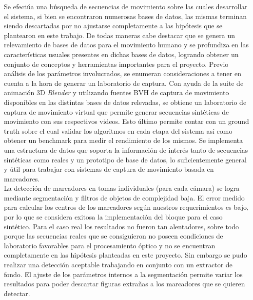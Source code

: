 Se efectúa una búsqueda de secuencias de movimiento sobre las cuales desarrollar el sistema, si bien se encontraron numerosas bases de datos, las mismas terminan siendo descartadas por no ajustarse completamente  a las hipótesis que se plantearon en este trabajo. De todas maneras cabe destacar que se genera un relevamiento de bases de datos para el movimiento humano y se profundiza en las características usuales presentes en dichas bases de datos, logrando obtener un conjunto de conceptos y herramientas importantes para el proyecto. Previo análisis de los parámetros involucrados, se enumeran consideraciones a tener en cuenta a la hora de generar un laboratorio de captura.
Con ayuda de la suite de animación 3D \emph{Blender} y utilizando fuentes BVH de captura de movimiento disponibles en las distintas bases de datos relevadas, se obtiene un laboratorio de captura de movimiento virtual que permite generar secuencias sintéticas de movimiento con sus respectivos videos. Esto último permite contar con un ground truth sobre el cual validar los algoritmos en cada etapa del sistema así como obtener un benchmark para medir el rendimiento de los mismos.
Se implementa una estructura de datos que soporta la información de interés tanto de secuencias sintéticas como reales y un prototipo de base de datos, lo suficientemente general y útil para trabajar con sistemas de captura de movimiento basada en marcadores.\\ 


La detección de marcadores en tomas individuales (para cada cámara) se logra mediante segmentación y filtros de objetos de complejidad baja. El error medido para calcular los centros de los marcadores según nuestros requerimientos es bajo, por lo que se considera exitosa la implementación del bloque para el caso sintético. Para el caso real los resultados no fueron tan alentadores, sobre todo porque las secuencias reales que se consiguieron no poseen condiciones de laboratorio favorables para el procesamiento óptico y no se encuentran completamente en las hipótesis planteadas en este proyecto. Sin embargo se pudo realizar una detección aceptable trabajando en conjunto con un extractor de fondo. El ajuste de los parámetros internos a la segmentación permite variar los resultados para poder descartar figuras extrañas a los marcadores que se quieren detectar.\\ 

